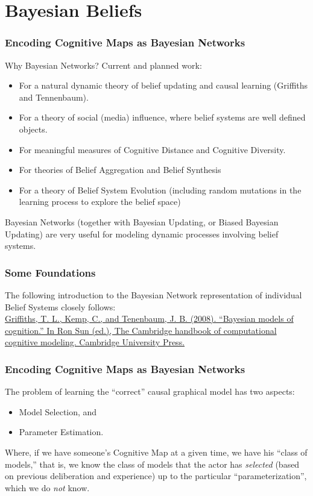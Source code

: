 \documentclass{beamer}
\begin{document}
\section{Bayesian Beliefs}
\begin{frame}
\frametitle{Encoding Cognitive Maps as Bayesian Networks}
Why Bayesian Networks? Current and planned work:

\begin{itemize}
\item For a natural dynamic theory of belief updating and causal learning (Griffiths and Tennenbaum).
\item For a theory of social (media) influence, where belief systems are well defined objects.
\item For meaningful measures of Cognitive Distance and Cognitive Diversity.
\item For theories of Belief Aggregation and Belief Synthesis
\item For a theory of Belief System Evolution (including random mutations in the learning process to explore the belief space)
\end{itemize}
Bayesian Networks (together with Bayesian Updating, or Biased Bayesian Updating) are very useful for modeling dynamic processes involving belief systems.
\end{frame}
\begin{frame}
\frametitle{Some Foundations}
The following introduction to the Bayesian Network representation of individual Belief Systems closely follows:\\
\href{http://cocosci.berkeley.edu/tom/papers/bayeschapter.pdf}{Griffiths, T. L., Kemp, C., and Tenenbaum, J. B. (2008). ``Bayesian models of cognition.'' In Ron Sun (ed.), The Cambridge handbook of computational cognitive modeling. Cambridge University Press.}

\end{frame}
\begin{frame}
\frametitle{Encoding Cognitive Maps as Bayesian Networks}
The problem of learning the ``correct'' causal graphical model has two aspects:
\begin{itemize}
\item Model Selection,
and
\item Parameter Estimation.
\end{itemize}
Where, if we have someone's Cognitive Map at a given time, we have his ``class of models,'' that is, we know the class of models that the actor has \textit{selected} (based on previous deliberation and experience) up to the particular ``parameterization'', which we do \textit{not} know.
\end{frame}
\end{document}
